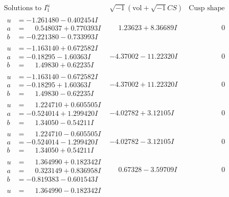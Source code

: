 \documentclass[1p]{elsarticle_modified}
\theoremstyle{definition}
\newcommand{\I}{\sqrt{-1}}
\begin{document}
$$\begin{array}{c|c|c}
\text{Solutions to }I^u_{1}& \I (\text{vol} + \sqrt{-1}CS) & \text{Cusp shape}\\
 \hline 
\begin{aligned}
u &= -1.261480 - 0.402454 I \\
a &= \phantom{-}0.548037 + 0.770393 I \\
b &= -0.221380 - 0.733993 I\end{aligned}
 & \phantom{-}1.23623 + 8.36689 I & \phantom{-0.000000 } 0 \\ \hline\begin{aligned}
u &= -1.163140 + 0.672582 I \\
a &= -0.18295 - 1.60363 I \\
b &= \phantom{-}1.49830 + 0.62235 I\end{aligned}
 & -4.37002 - 11.22320 I & \phantom{-0.000000 } 0 \\ \hline\begin{aligned}
u &= -1.163140 - 0.672582 I \\
a &= -0.18295 + 1.60363 I \\
b &= \phantom{-}1.49830 - 0.62235 I\end{aligned}
 & -4.37002 + 11.22320 I & \phantom{-0.000000 } 0 \\ \hline\begin{aligned}
u &= \phantom{-}1.224710 + 0.605505 I \\
a &= -0.524014 + 1.299420 I \\
b &= \phantom{-}1.34050 - 0.54211 I\end{aligned}
 & -4.02782 + 3.12105 I & \phantom{-0.000000 } 0 \\ \hline\begin{aligned}
u &= \phantom{-}1.224710 - 0.605505 I \\
a &= -0.524014 - 1.299420 I \\
b &= \phantom{-}1.34050 + 0.54211 I\end{aligned}
 & -4.02782 - 3.12105 I & \phantom{-0.000000 } 0 \\ \hline\begin{aligned}
u &= \phantom{-}1.364990 + 0.182342 I \\
a &= \phantom{-}0.323149 + 0.836958 I \\
b &= -0.819383 - 0.601543 I\end{aligned}
 & \phantom{-}0.67328 - 3.59709 I & \phantom{-0.000000 } 0 \\ \hline\begin{aligned}
u &= \phantom{-}1.364990 - 0.182342 I \\

\end{aligned}
\end{array}$$
\end{document}
